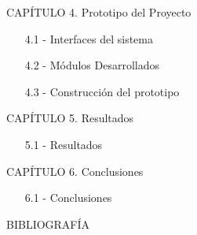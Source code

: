 \vspace{1em}
CAPÍTULO 4. Prototipo del Proyecto
\begin{enumerate}
  \item[4.1 -] Interfaces del sistema
  \item[4.2 -] Módulos Desarrollados
  \item[4.3 -] Construcción del prototipo
\end{enumerate}

\vspace{1em}
CAPÍTULO 5. Resultados
\begin{enumerate}
  \item[5.1 -] Resultados
\end{enumerate}

\vspace{1em}
CAPÍTULO 6. Conclusiones
\begin{enumerate}
  \item[6.1 -] Conclusiones
\end{enumerate}

\vspace{1em}
BIBLIOGRAFÍA
